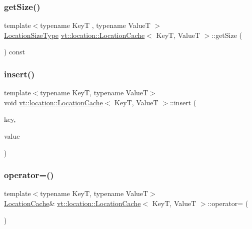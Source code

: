\subsubsection{\texorpdfstring{get\+Size()}{getSize()}}
{\footnotesize\ttfamily template$<$typename KeyT , typename ValueT $>$ \\
\hyperlink{namespacevt_1_1location_ab1c4c5849012a23eee2fbd1fce6159d7}{Location\+Size\+Type} \hyperlink{structvt_1_1location_1_1_location_cache}{vt\+::location\+::\+Location\+Cache}$<$ KeyT, ValueT $>$\+::get\+Size (\begin{DoxyParamCaption}{ }\end{DoxyParamCaption}) const}

\mbox{\label{structvt_1_1location_1_1_location_cache_a62020ee4735da790dd652f1cfcf2583d}} 
\subsubsection{\texorpdfstring{insert()}{insert()}}
{\footnotesize\ttfamily template$<$typename KeyT, typename ValueT$>$ \\
void \hyperlink{structvt_1_1location_1_1_location_cache}{vt\+::location\+::\+Location\+Cache}$<$ KeyT, ValueT $>$\+::insert (\begin{DoxyParamCaption}\item[{KeyT const \&}]{key,  }\item[{ValueT const \&}]{value }\end{DoxyParamCaption})}

\mbox{\label{structvt_1_1location_1_1_location_cache_a31d50fe03fe4686019333d1166d52769}} 
\subsubsection{\texorpdfstring{operator=()}{operator=()}}
{\footnotesize\ttfamily template$<$typename KeyT, typename ValueT$>$ \\
\hyperlink{structvt_1_1location_1_1_location_cache}{Location\+Cache}\& \hyperlink{structvt_1_1location_1_1_location_cache}{vt\+::location\+::\+Location\+Cache}$<$ KeyT, ValueT $>$\+::operator= (\begin{DoxyParamCaption}\item[{\hyperlink{structvt_1_1location_1_1_location_cache}{Location\+Cache}$<$ KeyT, ValueT $>$ const \&}]{ }\end{DoxyParamCaption})\hspace{0.3cm}{\ttfamily [default]}}

